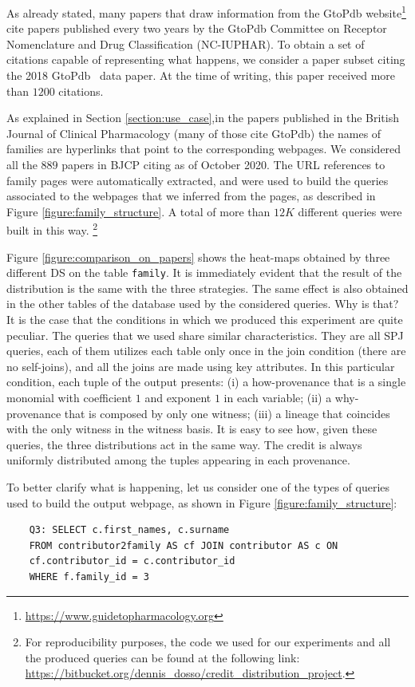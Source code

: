 As already stated, many papers that draw information from the GtoPdb website\footnote{\url{https://www.guidetopharmacology.org}} cite papers published every two years by the GtoPdb Committee on Receptor Nomenclature and Drug Classification (NC-IUPHAR).
To obtain a set of citations capable of representing what happens, we consider a paper subset citing the 2018 GtoPdb~\citep{iuphar2018} data paper. 
At the time of writing, this paper received more than $1200$ citations. 

As explained in Section \ref{section:use_case},in the papers published in the British Journal of Clinical Pharmacology (many of those cite GtoPdb) the names of families are hyperlinks that point to the corresponding webpages.
We considered all the $889$ papers in BJCP citing \citep{iuphar2018} as of October 2020. 
The URL references to family pages were automatically extracted, and were used to build the queries associated to the webpages that we inferred from the pages, as described in Figure \ref{figure:family_structure}.
A total of more than $12K$ different queries were built in this way. \footnote{For reproducibility purposes, the code we used for our experiments and all the produced queries can be found at the following link: \url{https://bitbucket.org/dennis_dosso/credit_distribution_project}.}

Figure \ref{figure:comparison_on_papers} shows the heat-maps obtained by three different DS on the table \texttt{family}.
It is immediately evident that the result of the distribution is the same with the three strategies. The same effect is also obtained in the other tables of the database used by the considered queries. 
Why is that? 
It is the case that the conditions in which we produced this experiment are quite peculiar. The queries that we used share similar characteristics. They are all SPJ queries, each of them utilizes each table only once in the join condition (there are no self-joins), and all the joins are made using key attributes. 
In this particular condition, each tuple of the output presents: (i) a how-provenance that is a single monomial with coefficient $1$ and exponent $1$ in each variable; (ii) a why-provenance that is composed by only one witness; (iii) a lineage that coincides with the only witness in the witness basis.
It is easy to see how, given these queries, the three distributions act in the same way.
The credit is always uniformly distributed among the tuples appearing in each provenance. 

To better clarify what is happening, let us consider one of the types of queries used to build the output webpage, as shown in Figure \ref{figure:family_structure}:
\begin{verbatim}
	Q3: SELECT c.first_names, c.surname
	FROM contributor2family AS cf JOIN contributor AS c ON 
	cf.contributor_id = c.contributor_id 
	WHERE f.family_id = 3
\end{verbatim}

